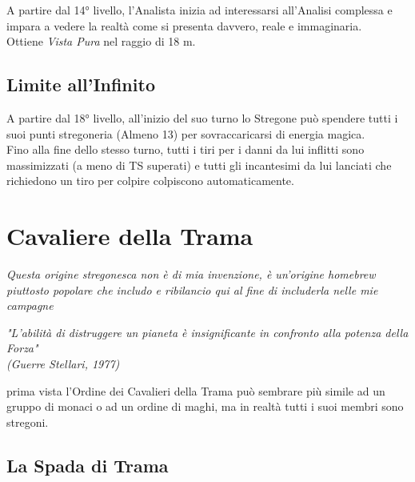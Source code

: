 A partire dal 14° livello, l'Analista inizia ad interessarsi all'Analisi complessa e impara a vedere la realtà come si presenta davvero, reale e immaginaria. \\ Ottiene \textit{Vista Pura} nel raggio di 18 m.

\subsection{Limite all'Infinito}

A partire dal 18° livello, all'inizio del suo turno lo Stregone può spendere tutti i suoi punti stregoneria (Almeno 13) per sovraccaricarsi di energia magica. \\ Fino alla fine dello stesso turno, tutti i tiri per i danni da lui inflitti sono massimizzati (a meno di TS superati) e tutti gli incantesimi da lui lanciati che richiedono un tiro per colpire colpiscono automaticamente.

\section{Cavaliere della Trama}
\textit{Questa origine stregonesca non è di mia invenzione, è un'origine homebrew piuttosto popolare che includo e ribilancio qui al fine di includerla nelle mie campagne}

\begin{DndReadAloud}
  \it
  "L'abilità di distruggere un pianeta è insignificante in confronto alla potenza della Forza" \\ (Guerre Stellari, 1977)
\end{DndReadAloud}

 prima vista l'Ordine dei Cavalieri della Trama può sembrare più simile ad un gruppo di monaci o ad un ordine di maghi, ma in realtà tutti i suoi membri sono stregoni.

\subsection{La Spada di Trama}

